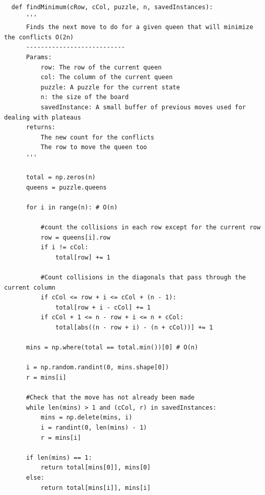 \documentclass{article}
\begin{document}
\begin{verbatim}
  def findMinimum(cRow, cCol, puzzle, n, savedInstances):
      '''
      Finds the next move to do for a given queen that will minimize the conflicts O(2n)
      ---------------------------
      Params:
          row: The row of the current queen
          col: The column of the current queen
          puzzle: A puzzle for the current state
          n: the size of the board
          savedInstance: A small buffer of previous moves used for dealing with plateaus
      returns:
          The new count for the conflicts
          The row to move the queen too
      '''
  
      total = np.zeros(n)
      queens = puzzle.queens
  
      for i in range(n): # O(n)
  
          #count the collisions in each row except for the current row
          row = queens[i].row
          if i != cCol:
              total[row] += 1
  
          #Count collisions in the diagonals that pass through the current column
          if cCol <= row + i <= cCol + (n - 1):
              total[row + i - cCol] += 1
          if cCol + 1 <= n - row + i <= n + cCol:
              total[abs((n - row + i) - (n + cCol))] += 1
  
      mins = np.where(total == total.min())[0] # O(n)

      i = np.random.randint(0, mins.shape[0])
      r = mins[i]
  
      #Check that the move has not already been made
      while len(mins) > 1 and (cCol, r) in savedInstances:
          mins = np.delete(mins, i)
          i = randint(0, len(mins) - 1)
          r = mins[i]
      
      if len(mins) == 1:
          return total[mins[0]], mins[0]
      else:
          return total[mins[i]], mins[i]
  
   \end{verbatim}
\newpage
\end{document}
